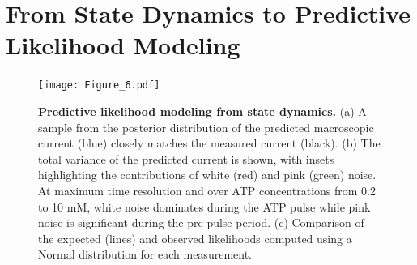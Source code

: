 \documentclass[pdflatex,sn-mathphys-num]{sn-jnl}%
\theoremstyle{thmstyleone}%
\theoremstyle{thmstyletwo}%
\theoremstyle{thmstylethree}%
\begin{document}

\section{From State Dynamics to Predictive Likelihood Modeling}
\label{sec:likelihood}

\begin{figure}[t]
	\centering
	\texttt{[image: Figure\_6.pdf]}
	\caption{\textbf{Predictive likelihood modeling from state dynamics.} (a) A sample from the posterior distribution of the predicted macroscopic current (blue) closely matches the measured current (black). (b) The total variance of the predicted current is shown, with insets highlighting the contributions of white (red) and pink (green) noise. At maximum time resolution and over ATP concentrations from 0.2 to 10 mM, white noise dominates during the ATP pulse while pink noise is significant during the pre-pulse period. (c) Comparison of the expected (lines) and observed likelihoods computed using a Normal distribution for each measurement.}
	\label{fig:SchemeX_likelihood}
\end{figure}
\end{document}
